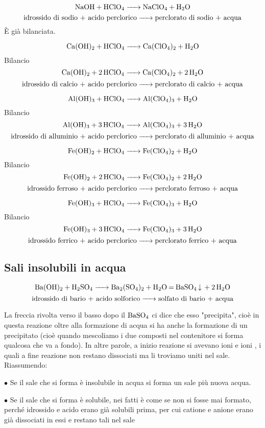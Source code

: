 $$\ce{NaOH + HClO_4 -> NaClO_4 + H_2O}$$
$$\text{idrossido di sodio + acido perclorico}\ce{->}\text{perclorato di sodio + acqua}$$
È già bilanciata.

$$\ce{Ca(OH)_2 + HClO_4 -> Ca(ClO_4)_2 + H_2O}$$Bilancio
$$\ce{Ca(OH)_2 + 2 HClO_4 -> Ca(ClO_4)_2 + 2 H_2O}$$
$$\text{idrossido di calcio + acido perclorico}\ce{->}\text{perclorato di calcio + acqua}$$

$$\ce{Al(OH)_3 + HClO_4 -> Al(ClO_4)_3 + H_2O}$$Bilancio
$$\ce{Al(OH)_3 + 3 HClO_4 -> Al(ClO_4)_3 + 3 H_2O}$$
$$\text{idrossido di alluminio + acido perclorico}\ce{->}\text{perclorato di alluminio + acqua}$$

$$\ce{Fe(OH)_2 + HClO_4 -> Fe(ClO_4)_2 + H_2O}$$Bilancio
$$\ce{Fe(OH)_2 + 2 HClO_4 -> Fe(ClO_4)_2 + 2 H_2O}$$
$$\text{idrossido ferroso + acido perclorico}\ce{->}\text{perclorato ferroso + acqua}$$

$$\ce{Fe(OH)_3 + HClO_4 -> Fe(ClO_4)_3 + H_2O}$$Bilancio
$$\ce{Fe(OH)_3 + 3 HClO_4 -> Fe(ClO_4)_3 + 3 H_2O}$$
$$\text{idrossido ferrico + acido perclorico}\ce{->}\text{perclorato ferrico + acqua}$$

\subsection{Sali insolubili in acqua}
$$\ce{Ba(OH)_2 + H_2SO_4 -> Ba_2(SO_4)_2 + H_2O = BaSO_4 v + 2H_2O}$$
$$\text{idrossido di bario + acido solforico}\ce{->}\text{solfato di bario + acqua}$$

La freccia rivolta verso il basso dopo il \(\ce{BaSO_4}\) ci dice che esso "precipita", cioè in questa reazione oltre alla formazione di acqua si ha anche la formazione di un precipitato (cioè quando mescoliamo i due composti nel contenitore si forma qualcosa che va a fondo). In altre parole, a inizio reazione si avevano ioni  e ioni , i quali a fine reazione non restano dissociati ma li troviamo uniti nel sale.\\

Riassumendo:

$\bullet$ Se il sale che si forma è insolubile in acqua si forma un sale più nuova acqua.

$\bullet$ Se il sale che si forma è solubile, nei fatti è come se non si fosse mai formato, perché idrossido e acido erano già solubili prima, per cui catione e anione erano già dissociati in essi e restano tali nel sale
